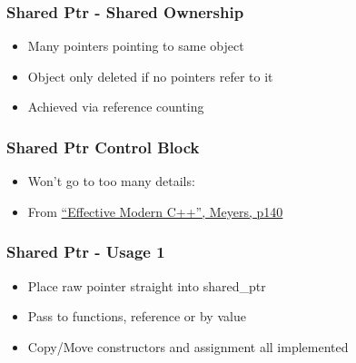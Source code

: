 \begin{Shaded}
\begin{Highlighting}[]
  \NormalTok{,}\NormalTok{));}
\NormalTok{\}}

\end{Highlighting}
\end{Shaded}

\hypertarget{shared-ptr---shared-ownership}{%
\subsubsection{Shared Ptr - Shared
Ownership}\label{shared-ptr---shared-ownership}}

\begin{itemize}
\tightlist
\item
  Many pointers pointing to same object
\item
  Object only deleted if no pointers refer to it
\item
  Achieved via reference counting
\end{itemize}

\hypertarget{shared-ptr-control-block}{%
\subsubsection{Shared Ptr Control
Block}\label{shared-ptr-control-block}}

\begin{itemize}
\item
  Won't go to too many details: 
\item
  From
  \href{https://www.amazon.co.uk/Effective-Modern-Specific-Ways-Improve/dp/1491903996/ref=sr_1_1?ie=UTF8\&qid=1484571499\&sr=8-1\&keywords=Effective+Modern+C\%2B\%2B}{``Effective
  Modern C++'', Meyers, p140}
\end{itemize}

\hypertarget{shared-ptr---usage-1}{%
\subsubsection{Shared Ptr - Usage 1}\label{shared-ptr---usage-1}}

\begin{itemize}
\tightlist
\item
  Place raw pointer straight into shared\_ptr
\item
  Pass to functions, reference or by value
\item
  Copy/Move constructors and assignment all implemented
\end{itemize}

